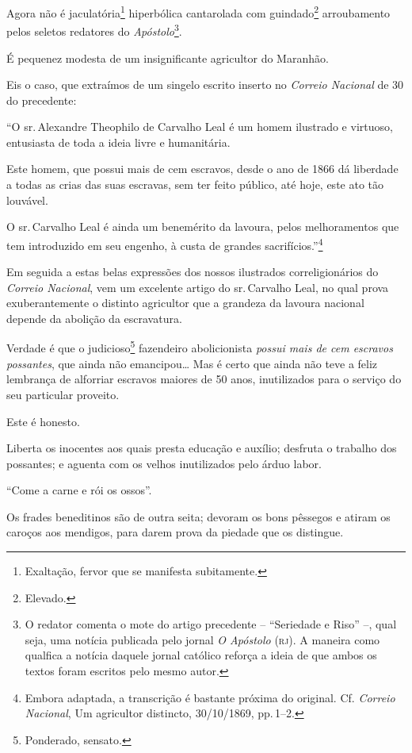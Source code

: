 Agora não é jaculatória\footnote{ Exaltação, fervor que se manifesta
  subitamente.} hiperbólica cantarolada com guindado\footnote{ Elevado.}
arroubamento pelos seletos redatores do \emph{Apóstolo}\footnote{ O
  redator comenta o mote do artigo precedente -- ``Seriedade e Riso'' --,
  qual seja, uma notícia publicada pelo jornal \emph{O Apóstolo} (\textsc{rj}). A
  maneira como qualfica a notícia daquele jornal católico reforça a
  ideia de que ambos os textos foram escritos pelo mesmo autor.}.

É pequenez modesta de um insignificante agricultor do Maranhão.

Eis o caso, que extraímos de um singelo escrito inserto no \emph{Correio
Nacional} de 30 do precedente:

``O sr.\,Alexandre Theophilo de Carvalho Leal é um homem ilustrado e
virtuoso, entusiasta de toda a ideia livre e humanitária.

Este homem, que possui mais de cem escravos, desde o ano de 1866 dá
liberdade a todas as crias das suas escravas, sem ter feito público, até
hoje, este ato tão louvável.

O sr.\,Carvalho Leal é ainda um benemérito da lavoura, pelos
melhoramentos que tem introduzido em seu engenho, à custa de grandes
sacrifícios.''\footnote{ Embora adaptada, a transcrição é bastante
  próxima do original. Cf. \emph{Correio Nacional}, Um agricultor
  distincto, 30/10/1869, pp.\,1--2.}

Em seguida a estas belas expressões dos nossos ilustrados
correligionários do \emph{Correio Nacional}, vem um excelente artigo do
sr.\,Carvalho Leal, no qual prova exuberantemente o distinto agricultor
que a grandeza da lavoura nacional depende da abolição da escravatura.

Verdade é que o judicioso\footnote{ Ponderado, sensato.} fazendeiro
abolicionista \emph{possui mais de cem escravos possantes}, que ainda
não emancipou\ldots{} Mas é certo que ainda não teve a feliz lembrança de
alforriar escravos maiores de 50 anos, inutilizados para o serviço do
seu particular proveito.

Este é honesto.

Liberta os inocentes aos quais presta educação e auxílio; desfruta o
trabalho dos possantes; e aguenta com os velhos inutilizados pelo árduo
labor.

``Come a carne e rói os ossos''.

Os frades beneditinos são de outra seita; devoram os bons pêssegos e
atiram os caroços aos mendigos, para darem prova da piedade que os
distingue.

